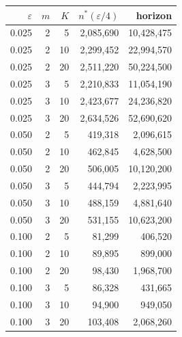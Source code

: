 \begin{tabular}{rrrrr}
\toprule
$\varepsilon$ & $m$ & $K$ & $n^*(\varepsilon/4)$ & horizon \\
\midrule
0.025 & 2 & 5 & 2,085,690 & 10,428,475 \\
0.025 & 2 & 10 & 2,299,452 & 22,994,570 \\
0.025 & 2 & 20 & 2,511,220 & 50,224,500 \\
0.025 & 3 & 5 & 2,210,833 & 11,054,190 \\
0.025 & 3 & 10 & 2,423,677 & 24,236,820 \\
0.025 & 3 & 20 & 2,634,526 & 52,690,620 \\
0.050 & 2 & 5 & 419,318 & 2,096,615 \\
0.050 & 2 & 10 & 462,845 & 4,628,500 \\
0.050 & 2 & 20 & 506,005 & 10,120,200 \\
0.050 & 3 & 5 & 444,794 & 2,223,995 \\
0.050 & 3 & 10 & 488,159 & 4,881,640 \\
0.050 & 3 & 20 & 531,155 & 10,623,200 \\
0.100 & 2 & 5 & 81,299 & 406,520 \\
0.100 & 2 & 10 & 89,895 & 899,000 \\
0.100 & 2 & 20 & 98,430 & 1,968,700 \\
0.100 & 3 & 5 & 86,328 & 431,665 \\
0.100 & 3 & 10 & 94,900 & 949,050 \\
0.100 & 3 & 20 & 103,408 & 2,068,260 \\
\bottomrule
\end{tabular}
